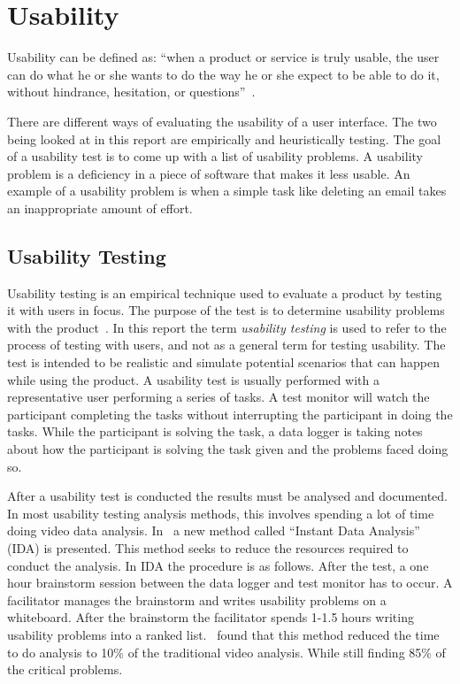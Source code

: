 \section{Usability}
\label{sub:usability}

Usability can be defined as: \enquote{when a product or service is truly usable, the user can do what he or she wants to do the way he or she expect to be able to do it, without hindrance, hesitation, or questions}~\cite{RubinChisnellSpool08}.

There are different ways of evaluating the usability of a user interface. The two being looked at in this report are empirically and heuristically testing. The goal of a usability test is to come up with a list of usability problems. A usability problem is a deficiency in a piece of software that makes it less usable. An example of a usability problem is when a simple task like deleting an email takes an inappropriate amount of effort.

\subsection{Usability Testing}
\label{sub:usabilityTesting}
Usability testing is an empirical technique used to evaluate a product by testing it with users in focus. The purpose of the test is to determine usability problems with the product~\cite{RubinChisnellSpool08}. In this report the term \emph{usability testing} is used to refer to the process of testing with users, and not as a general term for testing usability. The test is intended to be realistic and simulate potential scenarios that can happen while using the product. A usability test is usually performed with a representative user performing a series of tasks. A test monitor will watch the participant completing the tasks without interrupting the participant in doing the tasks. While the participant is solving the task, a data logger is taking notes about how the participant is solving the task given and the problems faced doing so.

After a usability test is conducted the results must be analysed and documented. In most usability testing analysis methods, this involves spending a lot of time doing video data analysis. In~\cite{kjeldskov2004instant} a new method called \enquote{Instant Data Analysis} (IDA) is presented. This method seeks to reduce the resources required to conduct the analysis. In IDA the procedure is as follows. After the test, a one hour brainstorm session between the data logger and test monitor has to occur. A facilitator  manages the brainstorm and writes usability problems on a whiteboard. After the brainstorm the facilitator spends 1-1.5 hours writing usability problems into a ranked list.~\cite{kjeldskov2004instant} found that this method reduced the time to do analysis to 10\% of the traditional video analysis. While still finding 85\% of the critical problems.

